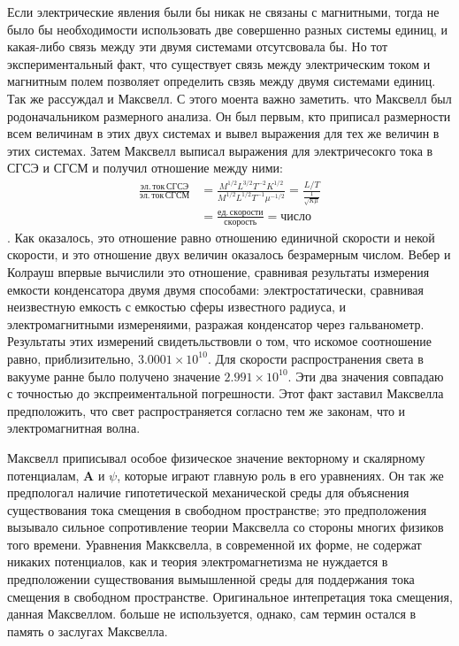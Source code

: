 \documentclass[12pt, oneside, a4paper]{article}
\begin{document}
Если электрические явления были бы никак не связаны с магнитными, тогда не было бы необходимости использовать две совершенно разных системы единиц, и какая-либо связь между эти двумя системами отсутсвовала бы. Но тот экспериментальный факт, что существует связь между электрическим током и магнитным полем позволяет определить свзяь между двумя системами единиц. Так же рассуждал и Максвелл. С этого моента важно заметить. что Максвелл был родоначальником размерного анализа. Он был первым, кто приписал размерности всем величинам в этих двух системах и вывел выражения для тех же величин в этих системах. Затем Максвелл выписал выражения для электричесокго тока в СГСЭ и СГСМ и получил отношение между ними:
\begin{align*}
\frac{эл.\,ток\,СГСЭ}{эл.\,ток\,СГСМ}&=\frac{M^{1/2}L^{3/2}T^{-2}K^{1/2}}{M^{1/2}L^{1/2}T^{-1}\mu^{-1/2}}=\frac{L/T}{\frac{1}{\sqrt{K\mu}}}\\&=\frac{ед.\, скорости}{скорость}=число
\end{align*}.
Как оказалось, это отношение равно отношению единичной скорости и некой скорости, и это отношение двух величин оказалось безрамерным числом. Вебер и Колрауш впервые вычислили это отношение, сравнивая результаты измерения емкости конденсатора двумя двумя способами: электростатически, сравнивая неизвестную емкость с емкостью сферы известного радиуса, и электромагнитными измереняими, разражая конденсатор через гальванометр. Результаты этих измерений свидетьльствовли о том, что искомое соотношение равно, приблизительно, $3.0001\times{}10^{10}$. Для скорости распространения света в вакууме ранне было получено значение $2.991\times{}10^{10}$. Эти два значения совпадаю с точностью до экспреиментальной погрешности. Этот факт заставил Максвелла предположить, что свет распространяется согласно тем же законам, что и электромагнитная волна. 

Максвелл приписывал особое физическое значение векторному и скалярному потенциалам, $\mathbf{A}$ и $\psi$, которые играют главную роль в его уравнениях. Он так же предпологал наличие гипотетической механической среды для объяснения существования тока смещения в свободном пространстве; это предположения вызывало сильное сопротивление теории Максвелла со стороны многих физиков того времени. Уравнения Макксвелла, в современной их форме, не содержат никаких потенциалов, как и теория электромагнетизма не нуждается в предположении существования вымышленной среды для поддержания тока смещения в свободном пространстве. Оригинальное интепретация тока смещения, данная Максвеллом. больше не используется, однако, сам термин остался в память о заслугах Максвелла. 
\end{document}
